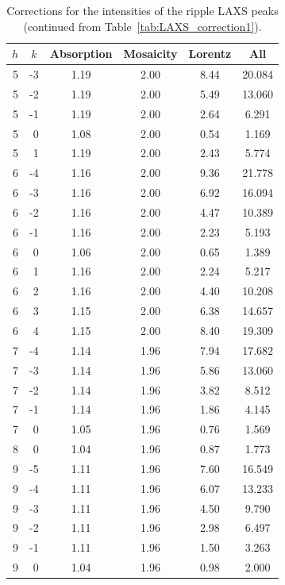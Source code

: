 \begin{table}[htbp]
  \centering
    \begin{tabular}{rrcccc}
    \hline
    \multicolumn{1}{c}{$h$} & \multicolumn{1}{c}{$k$} & \multicolumn{1}{c}{Absorption} & \multicolumn{1}{c}{Mosaicity} & \multicolumn{1}{c}{Lorentz} & \multicolumn{1}{c}{All}\\
    \hline        
    5  & -3 & 1.19 & 2.00 & 8.44 & 20.084 \\
    5  & -2 & 1.19 & 2.00 & 5.49 & 13.060 \\
    5  & -1 & 1.19 & 2.00 & 2.64 & 6.291  \\
    5  & 0  & 1.08 & 2.00 & 0.54 & 1.169  \\
    5  & 1  & 1.19 & 2.00 & 2.43 & 5.774  \\
    6  & -4 & 1.16 & 2.00 & 9.36 & 21.778 \\
    6  & -3 & 1.16 & 2.00 & 6.92 & 16.094 \\
    6  & -2 & 1.16 & 2.00 & 4.47 & 10.389 \\
    6  & -1 & 1.16 & 2.00 & 2.23 & 5.193  \\
    6  & 0  & 1.06 & 2.00 & 0.65 & 1.389  \\
    6  & 1  & 1.16 & 2.00 & 2.24 & 5.217  \\
    6  & 2  & 1.16 & 2.00 & 4.40 & 10.208 \\
    6  & 3  & 1.15 & 2.00 & 6.38 & 14.657 \\
    6  & 4  & 1.15 & 2.00 & 8.40 & 19.309 \\
    7  & -4 & 1.14 & 1.96 & 7.94 & 17.682 \\
    7  & -3 & 1.14 & 1.96 & 5.86 & 13.060 \\
    7  & -2 & 1.14 & 1.96 & 3.82 & 8.512  \\
    7  & -1 & 1.14 & 1.96 & 1.86 & 4.145  \\
    7  & 0  & 1.05 & 1.96 & 0.76 & 1.569  \\
    8  & 0  & 1.04 & 1.96 & 0.87 & 1.773  \\
    9  & -5 & 1.11 & 1.96 & 7.60 & 16.549 \\
    9  & -4 & 1.11 & 1.96 & 6.07 & 13.233 \\
    9  & -3 & 1.11 & 1.96 & 4.50 & 9.790  \\
    9  & -2 & 1.11 & 1.96 & 2.98 & 6.497  \\
    9  & -1 & 1.11 & 1.96 & 1.50 & 3.263  \\
    9  & 0  & 1.04 & 1.96 & 0.98 & 2.000  \\
    \hline
    \end{tabular}%
  \caption[Corrections for the intensities of the ripple LAXS peaks 
  (continued from Table~\ref{tab:LAXS_correction1})]
  {Corrections for the intensities of the ripple LAXS peaks 
  (continued from Table~\ref{tab:LAXS_correction1}).}
  \label{tab:LAXS_correction2}%
\end{table}%

